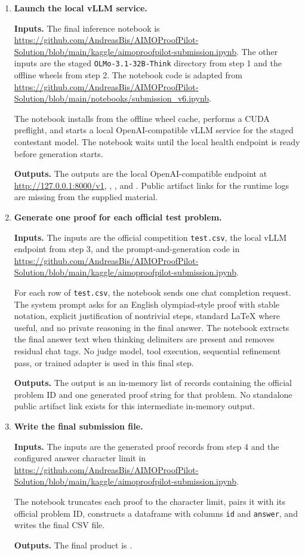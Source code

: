 \begin{enumerate}
\item \textbf{Launch the local vLLM service.}

\textbf{Inputs.} The final inference notebook is \url{https://github.com/AndreasBis/AIMOProofPilot-Solution/blob/main/kaggle/aimoproofpilot-submission.ipynb}. The other inputs are the staged \texttt{OLMo-3.1-32B-Think} directory from step 1 and the offline wheels from step 2. The notebook code is adapted from \url{https://github.com/AndreasBis/AIMOProofPilot-Solution/blob/main/notebooks/submission_v6.ipynb}.

The notebook installs from the offline wheel cache, performs a CUDA preflight, and starts a local OpenAI-compatible vLLM service for the staged contestant model. The notebook waits until the local health endpoint is ready before generation starts.

\textbf{Outputs.} The outputs are the local OpenAI-compatible endpoint at \url{http://127.0.0.1:8000/v1}, , , and . Public artifact links for the runtime logs are missing from the supplied material.

\item \textbf{Generate one proof for each official test problem.}

\textbf{Inputs.} The inputs are the official competition \texttt{test.csv}, the local vLLM endpoint from step 3, and the prompt-and-generation code in \url{https://github.com/AndreasBis/AIMOProofPilot-Solution/blob/main/kaggle/aimoproofpilot-submission.ipynb}.

For each row of \texttt{test.csv}, the notebook sends one chat completion request. The system prompt asks for an English olympiad-style proof with stable notation, explicit justification of nontrivial steps, standard LaTeX where useful, and no private reasoning in the final answer. The notebook extracts the final answer text when thinking delimiters are present and removes residual chat tags. No judge model, tool execution, sequential refinement pass, or trained adapter is used in this final step.

\textbf{Outputs.} The output is an in-memory list of records containing the official problem ID and one generated proof string for that problem. No standalone public artifact link exists for this intermediate in-memory output.

\item \textbf{Write the final submission file.}

\textbf{Inputs.} The inputs are the generated proof records from step 4 and the configured answer character limit in \url{https://github.com/AndreasBis/AIMOProofPilot-Solution/blob/main/kaggle/aimoproofpilot-submission.ipynb}.

The notebook truncates each proof to the character limit, pairs it with its official problem ID, constructs a dataframe with columns \texttt{id} and \texttt{answer}, and writes the final CSV file.

\textbf{Outputs.} The final product is .
\end{enumerate}

\endgroup
